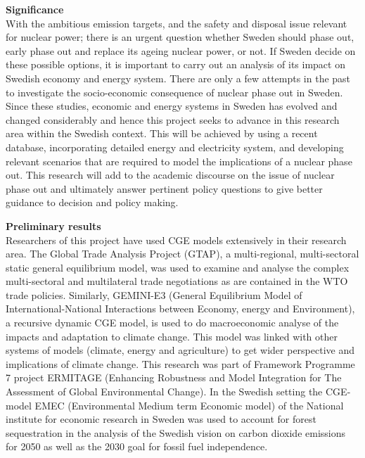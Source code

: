 
\textbf{Significance}\\
With the ambitious emission targets, and the safety and disposal issue relevant for nuclear power; there is an urgent question whether Sweden should phase out, early phase out and replace its ageing nuclear power, or not. If Sweden decide on these possible options, it is important to carry out an analysis of its impact on Swedish economy and energy system. There are only a few attempts in the past to investigate the socio-economic consequence of nuclear phase out in Sweden. Since these studies, economic and energy systems in Sweden has evolved and changed considerably and hence this project seeks to advance in this research area within the Swedish context. This will be achieved by using a recent database, incorporating detailed energy and electricity system, and developing relevant scenarios that are required to model the implications of a nuclear phase out. This research will add to the academic discourse on the issue of nuclear phase out and ultimately answer pertinent policy questions to give better guidance to decision and policy making.

\textbf{Preliminary results}\\
Researchers of this project have used CGE models extensively in their research area. The Global Trade Analysis Project (GTAP), a multi-regional, multi-sectoral static general equilibrium model, was used to examine and analyse the complex multi-sectoral and multilateral trade negotiations as are contained in the WTO trade policies. Similarly, GEMINI-E3 (General Equilibrium Model of International-National Interactions between Economy, energy and Environment), a recursive dynamic CGE model, is used to do macroeconomic analyse of the impacts and adaptation to climate change. This model was linked with other systems of models (climate, energy and agriculture) to get wider perspective and implications of climate change. This research was part of Framework Programme 7 project ERMITAGE (Enhancing Robustness and Model Integration for The Assessment of Global Environmental Change).
In the Swedish setting the CGE-model EMEC (Environmental Medium term Economic model) of the National institute for economic research in Sweden was used to account for forest sequestration in the analysis of the Swedish vision on carbon dioxide emissions for 2050 as well as the 2030 goal for fossil fuel independence.

